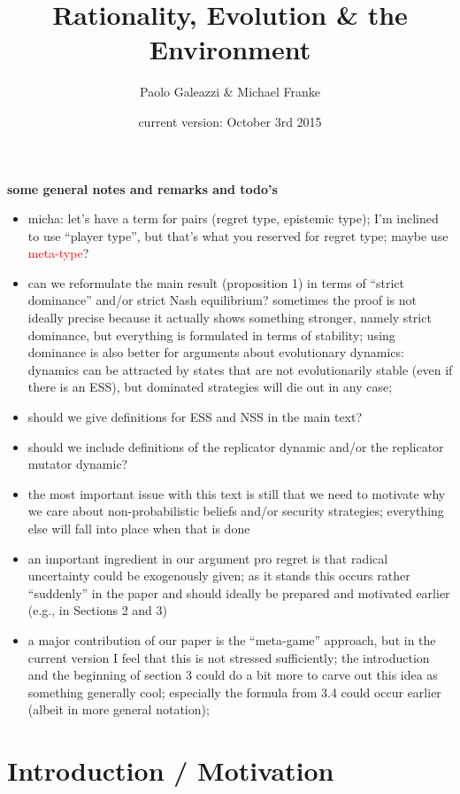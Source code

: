 \documentclass[fleqn,reqno,11pt]{article}
\title{Rationality, Evolution \& the Environment}
\author{Paolo Galeazzi \& Michael Franke}
\date{current version: October 3rd 2015}
\newcommand{\myalert}[1]{\textcolor{red}{#1}}
\begin{document}
\textbf{some general notes and remarks and todo's}

\begin{itemize}
\item micha: let's have a term for pairs (regret type, epistemic type); I'm inclined to use ``player
  type'', but that's what you reserved for regret type; maybe use \myalert{meta-type}?
\item can we reformulate the main result (proposition 1) in terms of ``strict dominance''
  and/or strict Nash equilibrium? sometimes the proof is not ideally precise because it
  actually shows something stronger, namely strict dominance, but everything is formulated in
  terms of stability; using dominance is also better for arguments about evolutionary dynamics:
  dynamics can be attracted by states that are not evolutionarily stable (even if there is an
  ESS), but dominated strategies will die out in any case;
\item should we give definitions for ESS and NSS in the main text?
\item should we include definitions of the replicator dynamic and/or the replicator mutator
  dynamic?
\item the most important issue with this text is still that we need to motivate why we care
  about non-probabilistic beliefs and/or security strategies; everything else will fall into
  place when that is done
\item an important ingredient in our argument pro regret is that radical uncertainty could be
  exogenously given; as it stands this occurs rather ``suddenly'' in the paper and should
  ideally be prepared and motivated earlier (e.g., in Sections 2 and 3)
\item a major contribution of our paper is the ``meta-game'' approach, but in the current
  version I feel that this is not stressed sufficiently; the introduction and the beginning of
  section 3 could do a bit more to carve out this idea as something generally cool; especially
  the formula from 3.4 could occur earlier (albeit in more general notation);
\end{itemize}

\newpage


\maketitle

\section{Introduction / Motivation}
\label{sec:intr--motiv}
\end{document}
